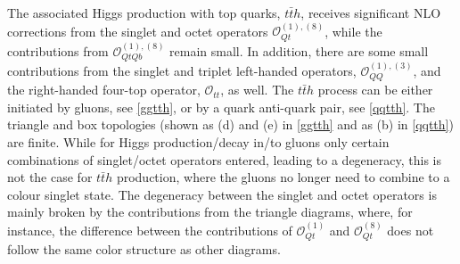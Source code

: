The associated Higgs production with top quarks, $t\bar{t}h$, receives significant  NLO corrections from the singlet and octet operators $\mathcal{O}_{Qt}^{(1),(8)}$, while the contributions from $\mathcal{O}_{QtQb}^{(1),(8)}$ remain small. In addition, there are some small contributions from the singlet and triplet left-handed operators, $\mathcal{O}_{QQ}^{(1),(3)}$, and the right-handed four-top operator, $\mathcal{O}_{tt}$, as well.
The $ t\bar{t} h$ process can be either initiated by gluons, see \autoref{ggtth}, or by a quark anti-quark pair, see \autoref{qqtth}.  The triangle and box topologies (shown as (d) and (e) in \autoref{ggtth} and as (b) in \autoref{qqtth}) are finite. While for Higgs production/decay in/to gluons only certain combinations of singlet/octet operators entered, leading to a degeneracy, this is not the case for $t\bar{t}h$ production, where the gluons no longer need to combine to a colour singlet state. 
The degeneracy between the singlet and octet operators is mainly broken by the contributions from the triangle diagrams, where, for instance, the difference between the contributions of $\mathcal{O}_{Qt}^{(1)}$ and $\mathcal{O}_{Qt}^{(8)}$ does not follow the same color structure as other diagrams.

